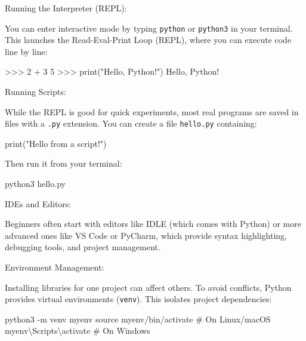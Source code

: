 \documentclass[
  letterpaper,
  DIV=11,
  numbers=noendperiod]{scrreprt}
\newenvironment{Shaded}{\begin{snugshade}}{\end{snugshade}}
\newcommand{\AttributeTok}[1]{\textcolor[rgb]{0.40,0.45,0.13}{#1}}
\newcommand{\BuiltInTok}[1]{\textcolor[rgb]{0.00,0.23,0.31}{#1}}
\newcommand{\CommentTok}[1]{\textcolor[rgb]{0.37,0.37,0.37}{#1}}
\newcommand{\DecValTok}[1]{\textcolor[rgb]{0.68,0.00,0.00}{#1}}
\newcommand{\ExtensionTok}[1]{\textcolor[rgb]{0.00,0.23,0.31}{#1}}
\newcommand{\NormalTok}[1]{\textcolor[rgb]{0.00,0.23,0.31}{#1}}
\newcommand{\OperatorTok}[1]{\textcolor[rgb]{0.37,0.37,0.37}{#1}}
\newcommand{\StringTok}[1]{\textcolor[rgb]{0.13,0.47,0.30}{#1}}
\begin{document}
Running the Interpreter (REPL):

You can enter interactive mode by typing \texttt{python} or
\texttt{python3} in your terminal. This launches the Read-Eval-Print
Loop (REPL), where you can execute code line by line:

\begin{Shaded}
\begin{Highlighting}[]
\OperatorTok{\textgreater{}\textgreater{}\textgreater{}} \DecValTok{2} \OperatorTok{+} \DecValTok{3}
\DecValTok{5}
\OperatorTok{\textgreater{}\textgreater{}\textgreater{}} \BuiltInTok{print}\NormalTok{(}\StringTok{"Hello, Python!"}\NormalTok{)}
\NormalTok{Hello, Python}\OperatorTok{!}
\end{Highlighting}
\end{Shaded}

Running Scripts:

While the REPL is good for quick experiments, most real programs are
saved in files with a \texttt{.py} extension. You can create a file
\texttt{hello.py} containing:

\begin{Shaded}
\begin{Highlighting}[]
\BuiltInTok{print}\NormalTok{(}\StringTok{"Hello from a script!"}\NormalTok{)}
\end{Highlighting}
\end{Shaded}

Then run it from your terminal:

\begin{Shaded}
\begin{Highlighting}[]
\ExtensionTok{python3}\NormalTok{ hello.py}
\end{Highlighting}
\end{Shaded}

IDEs and Editors:

Beginners often start with editors like IDLE (which comes with Python)
or more advanced ones like VS Code or PyCharm, which provide syntax
highlighting, debugging tools, and project management.

Environment Management:

Installing libraries for one project can affect others. To avoid
conflicts, Python provides virtual environments (\texttt{venv}). This
isolates project dependencies:

\begin{Shaded}
\begin{Highlighting}[]
\ExtensionTok{python3} \AttributeTok{{-}m}\NormalTok{ venv myenv}
\BuiltInTok{source}\NormalTok{ myenv/bin/activate   }\CommentTok{\# On Linux/macOS}
\ExtensionTok{myenv\textbackslash{}Scripts\textbackslash{}activate}      \CommentTok{\# On Windows}
\end{Highlighting}
\end{Shaded}
\end{document}
